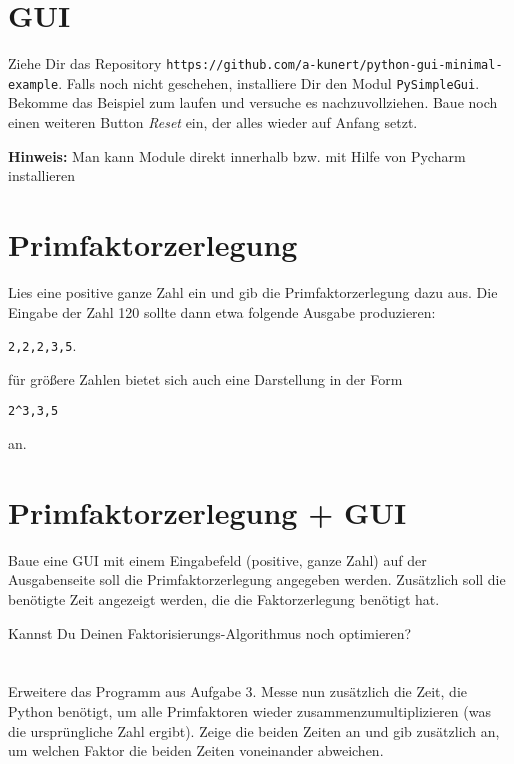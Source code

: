 \documentclass[a4paper]{article}
\begin{document}




\section{GUI}
Ziehe Dir das Repository \texttt{https://github.com/a-kunert/python-gui-minimal-example}. Falls noch nicht geschehen, installiere Dir den Modul \texttt{PySimpleGui}.
Bekomme das Beispiel zum laufen und versuche es nachzuvollziehen. 
Baue noch einen weiteren Button \emph{Reset} ein, der alles wieder auf Anfang setzt. 

\vspace{2pt}

{\footnotesize\textbf{Hinweis:}
	Man kann Module direkt innerhalb bzw. mit Hilfe von Pycharm installieren}


\section{Primfaktorzerlegung}
Lies eine positive ganze Zahl ein und gib die Primfaktorzerlegung dazu aus. Die Eingabe der Zahl 120 sollte dann etwa folgende Ausgabe produzieren:

\vspace{2pt}
\texttt{2,2,2,3,5}.

\vspace{2pt}

für größere Zahlen bietet sich auch eine Darstellung in der Form 

\vspace{2pt}

\texttt{2\^{}3,3,5}

\vspace{2pt}
an. 


\section{Primfaktorzerlegung + GUI}
Baue eine GUI mit einem Eingabefeld (positive, ganze Zahl) auf der Ausgabenseite soll die Primfaktorzerlegung angegeben werden. Zusätzlich soll die benötigte Zeit angezeigt werden, die die Faktorzerlegung benötigt hat. 


Kannst Du Deinen Faktorisierungs-Algorithmus noch optimieren? 


\section{}
Erweitere das Programm aus Aufgabe 3. Messe nun zusätzlich die Zeit, die Python benötigt, um alle Primfaktoren wieder zusammenzumultiplizieren (was die ursprüngliche Zahl ergibt). 
Zeige die beiden Zeiten an und gib zusätzlich an, um welchen Faktor die beiden Zeiten voneinander abweichen. 
\end{document}
